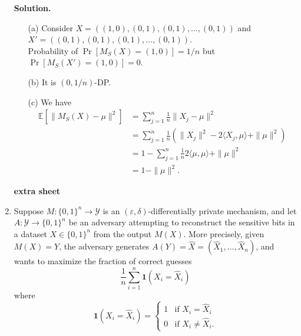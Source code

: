 \documentclass[12pt]{article}
\begin{document}
\begin{enumerate}
\begin{solution}
\textbf{Solution.}\\
\begin{enumerate}
    \item[(a)] Consider $X = ((1,0), (0,1), (0,1), \dots, (0,1))$ and $X' = ((0,1), (0,1), (0,1), \dots, (0,1))$.\\
    Probability of $\Pr[M_S(X) = (1,0)] = 1/n$ but $\Pr[M_S(X') = (1,0)] = 0$.
    
    \item[(b)] It is $(0, 1/n)$-DP.

    \item[(c)] We have
            \begin{align*}
            \mathbb{E}[\|M_S(X) - \mu\|^2]
            &= \sum_{j=1}^n \frac{1}{n} \|X_j - \mu\|^2 \\
            &= \sum_{j=1}^n \frac{1}{n} \left( \|X_j\|^2 - 2\langle X_j, \mu \rangle + \|\mu\|^2 \right) \\
            &= 1 - \sum_{j=1}^n \frac{1}{n} 2\langle \mu, \mu \rangle + \|\mu\|^2 \\
            &= 1 - \|\mu\|^2.
            \end{align*}

\end{enumerate}

\end{solution}

\begin{problem}
    \newpage
    {\bf extra sheet}
    \newpage
\end{problem}

\item Suppose $M : \{0,1\}^n \rightarrow \mathcal{Y}$ is an $(\varepsilon, \delta)$-differentially private mechanism, and let $A : \mathcal{Y} \rightarrow \{0,1\}^n$ be an adversary attempting to reconstruct the sensitive bits in a dataset $X \in \{0,1\}^n$ from the output $M(X)$. More precisely, given $M(X) = Y$, the adversary generates $A(Y) = \hat{X} = (\hat{X}_1, \dots, \hat{X}_n)$, and wants to maximize the fraction of correct guesses
\[
\frac{1}{n} \sum_{i=1}^n \mathbf{1}(X_i = \hat{X}_i)
\]
where
\[
\mathbf{1}(X_i = \hat{X}_i) =
\begin{cases}
1 & \text{if } X_i = \hat{X}_i \\
0 & \text{if } X_i \ne \hat{X}_i.
\end{cases}
\]


\end{enumerate}
\end{document}
